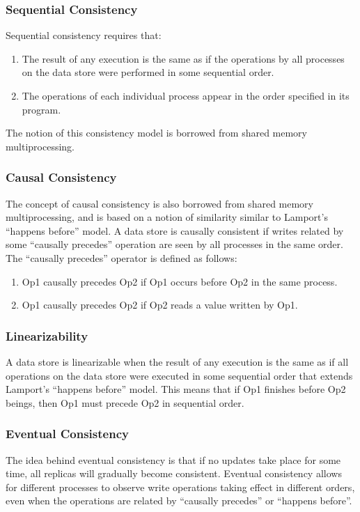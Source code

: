 \documentclass[12pt,titlepage]{article}
\begin{document}
      \subsubsection{Sequential Consistency}
        Sequential consistency requires that:
          \begin{enumerate}
            \item The result of any execution is the same as if the operations by all processes on the data store were performed in some
              sequential order.
            \item The operations of each individual process appear in the order specified in its program.
          \end{enumerate}
        The notion of this consistency model is borrowed from shared memory multiprocessing.

      \subsubsection{Causal Consistency}
        The concept of causal consistency is also borrowed from shared memory multiprocessing, and is based on a notion of similarity similar
        to Lamport's ``happens before'' model. A data store is causally consistent if writes related by some ``causally precedes'' operation
        are seen by all processes in the same order. The ``causally precedes'' operator is defined as follows:
          \begin{enumerate}
            \item Op1 causally precedes Op2 if Op1 occurs before Op2 in the same process.
            \item Op1 causally precedes Op2 if Op2 reads a value written by Op1.
          \end{enumerate}

      \subsubsection{Linearizability}
        A data store is linearizable when the result of any execution is the same as if all operations on the data store were executed in some
        sequential order that extends Lamport's ``happens before'' model. This means that if Op1 finishes before Op2 beings, then Op1 must precede
        Op2 in sequential order.

      \subsubsection{Eventual Consistency}
        The idea behind eventual consistency is that if no updates take place for some time, all replicas will gradually become consistent.
        Eventual consistency allows for different processes to observe write operations taking effect in different orders, even when the operations
        are related by ``causally precedes'' or ``happens before''.
\end{document}
